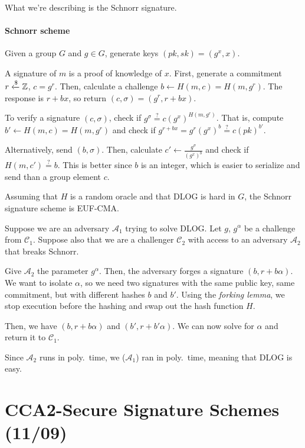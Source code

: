 \documentclass[notes]{agony}
\newcommand{\xgets}{\xleftarrow}
\newcommand{\ndgets}{\xgets{\mathdollar}}
\begin{document}
What we're describing is the Schnorr signature.

\paragraph{Schnorr scheme}
Given a group $G$ and $g \in G$,
generate keys $(pk, sk) = (g^x, x)$.

A signature of $m$ is a proof of knowledge of $x$.
First, generate a commitment $r \ndgets \Z$, $c = g^r$.
Then, calculate a challenge $b \gets H(m,c) = H(m,g^r)$.
The response is $r+bx$, so return $(c, \sigma) = (g^r, r+bx)$.

To verify a signature $(c, \sigma)$,
check if $g^\sigma \stackrel{?}{=} c(g^x)^{H(m, g^r)}$.
That is, compute $b' \gets H(m, c) = H(m, g^r)$
and check if $g^{r+bx} = g^r (g^x)^b \stackrel{?}{=} c(pk)^{b'}$.

Alternatively, send $(b, \sigma)$.
Then, calculate $c' \gets \frac{g^\sigma}{(g^x)^b}$
and check if $H(m, c') \stackrel{?}{=} b$.
This is better since $b$ is an integer,
which is easier to serialize and send than a group element $c$.

\begin{theorem}[Schnorr]
  Assuming that $H$ is a random oracle and that DLOG is hard in $G$,
  the Schnorr signature scheme is EUF-CMA.
\end{theorem}
\begin{prf}
  Suppose we are an adversary $\mathcal A_1$ trying to solve DLOG.
  Let $g$, $g^\alpha$ be a challenge from $\mathcal C_1$.
  Suppose also that we are a challenger $\mathcal C_2$
  with access to an adversary $\mathcal A_2$ that breaks Schnorr.

  Give $\mathcal A_2$ the parameter $g^\alpha$.
  Then, the adversary forges a signature $(b, r + b\alpha)$.
  We want to isolate $\alpha$, so we need two signatures
  with the same public key, same commitment, but with different hashes $b$ and $b'$.
  Using the \emph{forking lemma}, we stop execution before the hashing
  and swap out the hash function $H$.

  Then, we have $(b, r + b\alpha)$ and $(b', r + b'\alpha)$.
  We can now solve for $\alpha$ and return it to $\mathcal C_1$.

  Since $\mathcal A_2$ runs in poly.\ time,
  we ($\mathcal A_1$) ran in poly.\ time,
  meaning that DLOG is easy.
\end{prf}

\section{CCA2-Secure Signature Schemes (11/09)}
\end{document}
